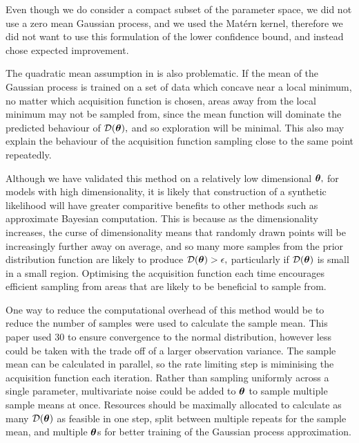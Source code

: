 Even though we do consider a compact subset of the parameter space,
we did not use a zero mean Gaussian process, and we used the Mat\'ern kernel,
therefore we did not want to use this formulation of the lower confidence bound,
and instead chose expected improvement.

The quadratic mean assumption in \cite{gutmann_bayesian_2016} is also
problematic. If the mean of the Gaussian process
is trained on a set of data which concave near a local
minimum, no matter which acquisition function is chosen, areas away from the
local minimum may not be sampled from, since the mean function will dominate
the predicted behaviour of $\mathcal{D}(\bm{\theta}),$ and so exploration will be minimal.
This also may explain the behaviour of the acquisition function sampling close
to the same point repeatedly.

Although we have validated this method on a relatively low dimensional
$\bm{\theta},$ for models with high dimensionality, it is likely that construction
of a synthetic likelihood will have greater comparitive benefits
to other methods such as approximate Bayesian computation.
This is because as the dimensionality increases, the curse of dimensionality
means that randomly drawn points will be increasingly further away on average,
and so many more samples from the prior distribution function are likely to
produce $\mathcal{D}(\bm{\theta}) > \epsilon,$ particularly if $\mathcal{D}(\bm{\theta})$ is small in
a small region. Optimising the acquisition function each time encourages
efficient sampling from areas that are likely to be beneficial to sample from.

One way to reduce the computational overhead of this method would be to reduce
the number of samples were used to calculate the sample mean. This paper used
30 to ensure convergence to the normal distribution, however less could be
taken with the trade off of a larger observation variance. The sample mean
can be calculated in parallel, so the rate limiting step is miminising the
acquisition function each iteration. Rather than sampling
uniformly across a single parameter, multivariate noise could be added to
$\bm{\theta}$ to sample multiple sample means at once.
Resources should be maximally allocated
to calculate as many $\mathcal{D}(\bm{\theta})$ as feasible in one step, split between
multiple repeats for the sample mean, and multiple $\bm{\theta}$s for better
training of the Gaussian process approximation.